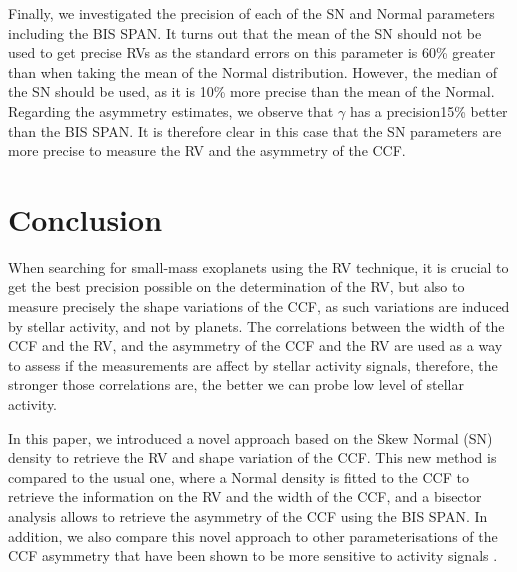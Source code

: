 \documentclass{aa}
\begin{document}
Finally, we investigated the precision of each of the SN and Normal parameters including the BIS SPAN. It turns out that the mean of the SN should not be used to get precise RVs as the standard errors on this parameter is 60\% greater than when taking the mean of the Normal distribution. However, the median of the SN should be used, as it is 10\% more precise than the mean of the Normal. Regarding the asymmetry estimates, we observe that $\gamma$ has a precision15\% better than the BIS SPAN. It is therefore clear in this case that the SN parameters are more precise to measure the RV and the asymmetry of the CCF.


\section{Conclusion} \label{sec:conclu}

When searching for small-mass exoplanets using the RV technique, it is crucial to get the best precision possible on the determination of the RV, but also to measure precisely the shape variations of the CCF, as such variations are induced by stellar activity, and not by planets. The correlations between the width of the CCF and the RV, and the asymmetry of the CCF and the RV are used as a way to assess if the measurements are affect by stellar activity signals, therefore, the stronger those correlations are, the better we can probe low level of stellar activity.

In this paper, we introduced a novel approach based on the Skew Normal (SN) density to retrieve the RV and shape variation of the CCF. This new method is compared to the usual one, where a Normal density is fitted to the CCF to retrieve the information on the RV and the width of the CCF, and a bisector analysis allows to retrieve the asymmetry of the CCF using the BIS SPAN. In addition, we also compare this novel approach to other parameterisations of the CCF asymmetry that have been shown to be more sensitive to activity signals \citep[][]{Boisse-2011,Figueira-2013}.
\end{document}
